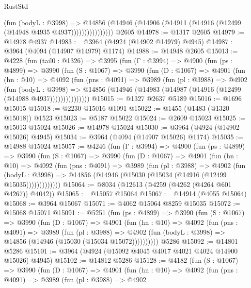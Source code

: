 \begin{lexlean}{RustStd}
\begin{coremodule}
{\begin{coremodule}
{{{{{{{{{{{{{{{{{{{{{{{{{{{{{{{{{{{{{{                      (fun (bodyL : @3998) =>
                      @14856
                        (@14946 (@14906 (@14911 (@14916 (@12499 (@14948 @4935 @4937))))))))))))))))
    @2605
@14978 := @1317 @2605
@14979 := @14978 @4937
@14983 := @3964 (@4924 (@14902 @14979) @4945)
@14987 := @3964 (@4094 (@14907 @14979) @1174)
@14988 := @14948 @2605
@15013 := @4228
    (fun (tail0 : @1326) =>
    @3995
      (fun (Γ : @3994) =>
      @4900
        (fun (ps : @4899) =>
        @3990
          (fun (S : @1067) =>
          @3990
            (fun (D : @1067) =>
            @4901
              (fun (hn : @10) =>
              @4092
                (fun (pns : @4091) =>
                @3989
                  (fun (pl : @3988) =>
                  @4902
                    (fun (bodyL : @3998) =>
                    @14856 (@14946 (@14983 (@14987 (@14916 (@12499 (@14988 @4937)))))))))))))))
@15015 := @1327 @2637 @5189
@15016 := @1696 @15015
@15018 := @2230 @15016 @1091
@15022 := @1455 (@1483 (@1320 @15018)) @1523
@15023 := @5187 @15022
@15024 := @2609 @15023
@15025 := @15013 @15024
@15026 := @14978 @15024
@15030 := @3964 (@4924 (@14902 @15026) @4945)
@15034 := @3964 (@4094 (@14907 @15026) @1174)
@15035 := @14988 @15024
@15057 := @4246
    (fun (Γ : @3994) =>
    @4900
      (fun (ps : @4899) =>
      @3990
        (fun (S : @1067) =>
        @3990
          (fun (D : @1067) =>
          @4901
            (fun (hn : @10) =>
            @4092
              (fun (pns : @4091) =>
              @3989
                (fun (pl : @3988) =>
                @4902
                  (fun (bodyL : @3998) =>
                  @14856 (@14946 (@15030 (@15034 (@14916 (@12499 @15035)))))))))))))
@15064 := @8034 (@12613 (@4259 (@4262 (@4264 @601 @4267)) @4042))
@15065 := @15057 @15064
@15067 := @14914 (@4055 @15064)
@15068 := @3964 @15067
@15071 := @4062 @15064 @8259 @15035
@15072 := @15068 @15071
@15091 := @5251
    (fun (ps : @4899) =>
    @3990
      (fun (S : @1067) =>
      @3990
        (fun (D : @1067) =>
        @4901
          (fun (hn : @10) =>
          @4092
            (fun (pns : @4091) =>
            @3989
              (fun (pl : @3988) =>
              @4902 (fun (bodyL : @3998) => @14856 (@14946 (@15030 (@15034 @15072))))))))))
    @5286
@15092 := @14801 @5286
@15101 := @3964 (@4924 (@15092 @4045 @4017 @4021 @4024 @14900 @15026) @4945)
@15102 := @14812 @5286
@15128 := @4182
    (fun (S : @1067) =>
    @3990
      (fun (D : @1067) =>
      @4901
        (fun (hn : @10) =>
        @4092
          (fun (pns : @4091) =>
          @3989
            (fun (pl : @3988) =>
            @4902
}}}}}}}}}}}}}}}}}}}}}}}}}}}}}}}}}}}}}}
\end{coremodule}}
\end{coremodule}
\end{lexlean}
